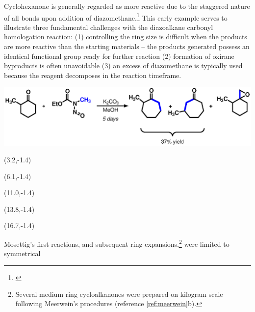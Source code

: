 Cyclohexanone is generally regarded as more reactive due to the staggered nature of all bonds upon
addition of diazomethane.\footnote{ \label{ref:gutschereview}} This early
example serves to illustrate three fundamental challenges with the diazoalkane carbonyl homologation reaction: (1)
controlling the ring size is difficult when the products are more reactive than the starting
materials -- the products generated possess an identical functional group ready for further
reaction (2) formation of oxirane byproducts is often unavoidable (3) an excess of diazomethane is typically
used because the reagent decomposes in the reaction timeframe.

 \begin{Scheme}[b]
  \centering
  \includegraphics[scale=0.8]{chp_diazobkg/images/adamsonkenner}
\begin{textblock}{1}(3.2,-1.4)  \end{textblock}
\begin{textblock}{1}(6.1,-1.4)  \end{textblock}
\begin{textblock}{1}(11.0,-1.4)  \end{textblock} 
\begin{textblock}{1}(13.8,-1.4)  \end{textblock}  
\begin{textblock}{1}(16.7,-1.4)  \end{textblock}
  \caption{First ring expansion of a 2-substituted cycloalkanone.}
  \label{sch:adamsonkenner}
\end{Scheme}
Mosettig's first reactions, and subsequent ring expansions,\footnote{Several
medium ring cycloalkanones were prepared on kilogram scale following Meerwein's
procedures (reference \ref{ref:meerwein}b). } were limited to symmetrical
